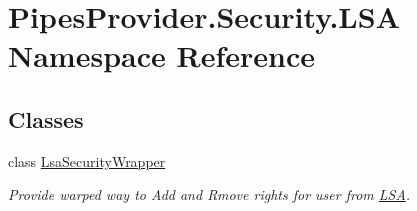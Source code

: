\hypertarget{namespace_pipes_provider_1_1_security_1_1_l_s_a}{}\section{Pipes\+Provider.\+Security.\+L\+SA Namespace Reference}
\label{namespace_pipes_provider_1_1_security_1_1_l_s_a}
\subsection*{Classes}
\begin{DoxyCompactItemize}
\item 
class \mbox{\hyperlink{class_pipes_provider_1_1_security_1_1_l_s_a_1_1_lsa_security_wrapper}{Lsa\+Security\+Wrapper}}
\begin{DoxyCompactList}\small\item\em Provide warped way to Add and Rmove rights for user from \mbox{\hyperlink{namespace_pipes_provider_1_1_security_1_1_l_s_a}{L\+SA}}. \end{DoxyCompactList}\end{DoxyCompactItemize}
